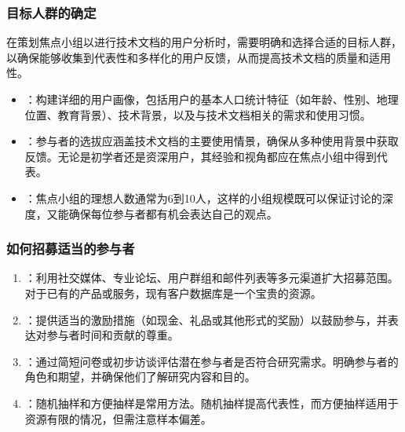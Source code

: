 \documentclass[letterpaper,10pt,english]{sphinxmanual}
\begin{document}
\subsubsection{目标人群的确定}
\label{\detokenize{user-research/focus-group:id13}}
\sphinxAtStartPar
在策划焦点小组以进行技术文档的用户分析时，需要明确和选择合适的目标人群，以确保能够收集到代表性和多样化的用户反馈，从而提高技术文档的质量和适用性。
\begin{itemize}
\item {} 
\sphinxAtStartPar
{}：构建详细的用户画像，包括用户的基本人口统计特征（如年龄、性别、地理位置、教育背景）、技术背景，以及与技术文档相关的需求和使用习惯。

\item {} 
\sphinxAtStartPar
{}：参与者的选拔应涵盖技术文档的主要使用情景，确保从多种使用背景中获取反馈。无论是初学者还是资深用户，其经验和视角都应在焦点小组中得到代表。

\item {} 
\sphinxAtStartPar
{}：焦点小组的理想人数通常为6到10人，这样的小组规模既可以保证讨论的深度，又能确保每位参与者都有机会表达自己的观点。

\end{itemize}


\subsubsection{如何招募适当的参与者}
\label{\detokenize{user-research/focus-group:id14}}\begin{enumerate}
%
\item {} 
\sphinxAtStartPar
{}：利用社交媒体、专业论坛、用户群组和邮件列表等多元渠道扩大招募范围。对于已有的产品或服务，现有客户数据库是一个宝贵的资源。

\item {} 
\sphinxAtStartPar
{}：提供适当的激励措施（如现金、礼品或其他形式的奖励）以鼓励参与，并表达对参与者时间和贡献的尊重。

\item {} 
\sphinxAtStartPar
{}：通过简短问卷或初步访谈评估潜在参与者是否符合研究需求。明确参与者的角色和期望，并确保他们了解研究内容和目的。

\item {} 
\sphinxAtStartPar
{}：随机抽样和方便抽样是常用方法。随机抽样提高代表性，而方便抽样适用于资源有限的情况，但需注意样本偏差。

\end{enumerate}
\end{document}
